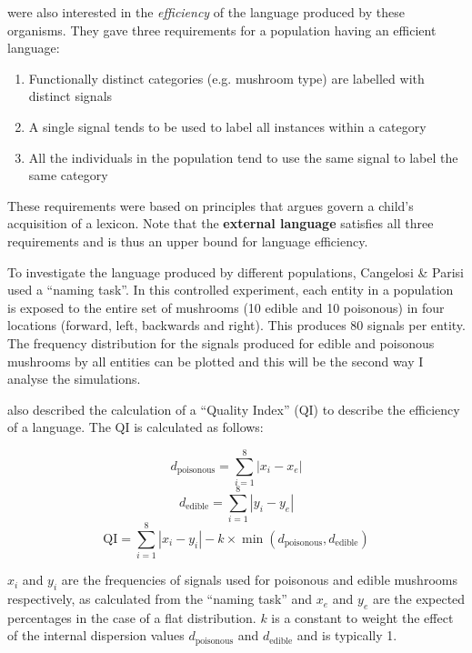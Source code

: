 \documentclass[12pt,a4paper,twoside,openright]{report}
\begin{document}
\cite{Cangelosi1998} were also interested in the \emph{efficiency} of the language produced by these organisms. They gave three requirements for a population having an efficient language:

\begin{enumerate}
	\item Functionally distinct categories (e.g. mushroom type) are labelled with distinct signals
	\item A single signal tends to be used to label all instances within a category
	\item All the individuals in the population tend to use the same signal to label the same category
\end{enumerate}

These requirements were based on principles that \cite{Clark1995} argues govern a child's acquisition of a lexicon. Note that the {\bf external language} satisfies all three requirements and is thus an upper bound for language efficiency.

To investigate the language produced by different populations, Cangelosi \& Parisi used a ``naming task''. In this controlled experiment, each entity in a population is exposed to the entire set of mushrooms (10 edible and 10 poisonous) in four locations (forward, left, backwards and right). This produces 80 signals per entity. The frequency distribution for the signals produced for edible and poisonous mushrooms by all entities can be plotted and this will be the second way I analyse the simulations.

\citet{Cangelosi1998} also described the calculation of a ``Quality Index'' (QI) to describe the efficiency of a language. The QI is calculated as follows:

\begin{equation}
\label{equation:dpoisonous}
d_{\mathrm{poisonous}} = \sum^{8}_{i = 1}{|x_i - x_e|}
\end{equation}
\begin{equation}
\label{equation:dedible}
d_{\mathrm{edible}} = \sum^{8}_{i = 1}{|y_i - y_e|}
\end{equation}
\begin{equation}
\label{equation:qi}
\mathrm{QI} = \sum^{8}_{i = 1} |x_i - y_i| - k \times \min (d_{\mathrm{poisonous}}, d_{\mathrm{edible}})
\end{equation}

$x_i$ and $y_i$ are the frequencies of signals used for poisonous and edible mushrooms respectively, as calculated from the ``naming task'' and $x_e$ and $y_e$ are the expected percentages in the case of a flat distribution. $k$ is a constant to weight the effect of the internal dispersion values $d_{\mathrm{poisonous}}$ and $d_{\mathrm{edible}}$ and is typically 1.
\end{document}

